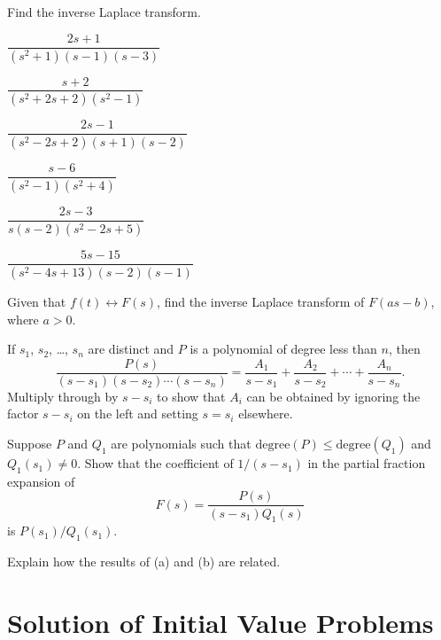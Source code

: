 \begin{exerciselist}
\item\label{exer:8.2.8}Find the inverse Laplace transform.

\begin{alist*}[columns=2,beginpenalty={5000}]
\item $\dfrac{2s+1}{(s^2+1)(s-1)(s-3)}$
\item $\dfrac{s+2}{(s^2+2s+2)(s^2-1)}$
\item $\dfrac{2s-1}{(s^2-2s+2)(s+1)(s-2)}$
\item $\dfrac{s-6}{(s^2-1)(s^2+4)}$
\item $\dfrac{2s-3}{s(s-2)(s^2-2s+5)}$
\item $\dfrac{5s-15}{(s^2-4s+13)(s-2)(s-1)}$
\end{alist*}

\item\label{exer:8.2.9}Given that $f(t)\leftrightarrow F(s)$, find the inverse
Laplace transform of $F(as-b)$, where $a>0$.


\item\label{exer:8.2.10}\begin{alist}
\item  %
If $s_1$, $s_2$, \dots, $s_n$ are distinct and $P$ is a polynomial of
degree less than $n$, then
\[
\frac{P(s)}{(s-s_1)(s-s_2)\cdots(s-s_n)}=
\frac{A_1}{s-s_1}+\frac{A_2}{s-s_2}+\cdots+\frac{A_n}{s-s_n}.
\]
Multiply through by $s-s_i$ to show that
 $A_i$ can be obtained by ignoring the factor $s-s_i$ on the
left  and setting $s=s_i$ elsewhere.
\item %
Suppose $P$ and $Q_1$ are polynomials such that
$\mathrm{degree}(P)\le\mathrm{degree}(Q_1)$ and $Q_1(s_1)\ne0$.
Show that the coefficient of $1/(s-s_1)$ in the partial fraction
expansion of
\[
F(s)=\frac{P(s)}{(s-s_1)Q_1(s)}
\]
is $P(s_1)/Q_1(s_1)$.
\item %
Explain how the results of (a) and (b) are related.
\end{alist}

\end{exerciselist}


\section{Solution of Initial Value Problems}\label{sec:laplace_ivp}

